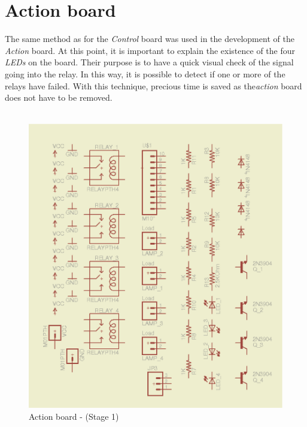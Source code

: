 \documentclass[12pt,a4paper,draft]{report}
\begin{document}
\section{Action board}
The same method as for the \textit{Control} board was used in the development of the \textit{Action} board.
At this point, it is important to explain the existence of the four \textit{LEDs} on the board.
Their purpose is to have a quick visual check of the signal going into the relay.
In this way, it is possible to detect if one or more of the relays have failed.
With this technique, precious time is saved as the\textit{action} board does not have to be removed. \\ %
\ \\
\begin{figure}[H]
\centering
\includegraphics*[scale=0.25]{action_brd_s1}
\caption{Action board -  (Stage 1)}
\label{Action-brd-s1}
\end{figure}
\ \\
\end{document}
